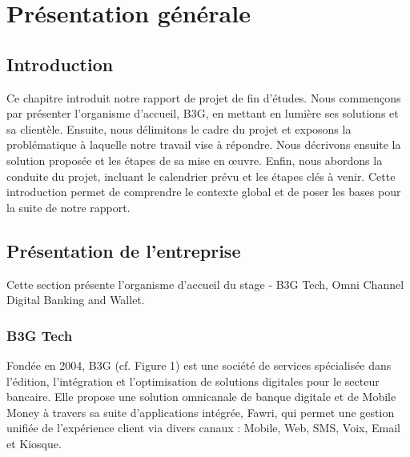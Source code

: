 \chapter{Présentation générale}
\label{chap:Présentation générale}


\section*{Introduction}

\hspace{\parindent}Ce chapitre introduit notre rapport de projet de fin d'études. Nous commençons par présenter l'organisme d'accueil, B3G, en mettant en lumière ses solutions et sa clientèle. Ensuite, nous délimitons le cadre du projet et exposons la problématique à laquelle notre travail vise à répondre. Nous décrivons ensuite la solution proposée et les étapes de sa mise en œuvre. Enfin, nous abordons la conduite du projet, incluant le calendrier prévu et les étapes clés à venir. Cette introduction permet de comprendre le contexte global et de poser les bases pour la suite de notre rapport.
\newpage

\section{Présentation de l'entreprise}

\hspace{\parindent}Cette section présente l'organisme d'accueil du stage - B3G Tech, Omni Channel Digital Banking and Wallet.

\subsection{B3G Tech}

\hspace{\parindent}Fondée en 2004, B3G (cf. Figure 1) est une société de services spécialisée dans l'édition, l'intégration et l'optimisation de solutions digitales pour le secteur bancaire. Elle propose une solution omnicanale de banque digitale et de Mobile Money à travers sa suite d'applications intégrée, Fawri, qui permet une gestion unifiée de l'expérience client via divers canaux : Mobile, Web, SMS, Voix, Email et Kiosque.





